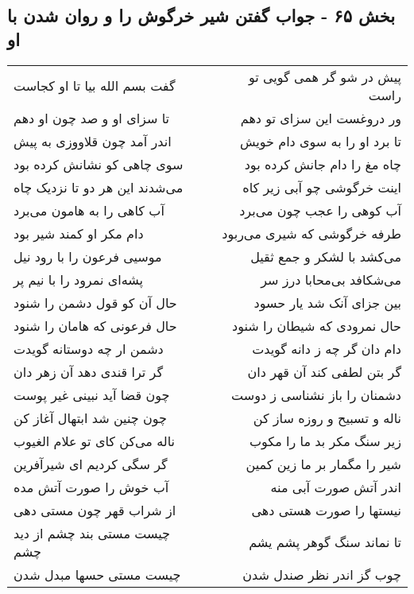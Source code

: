 \begin{center}
\section*{بخش ۶۵ - جواب گفتن شیر خرگوش را و روان شدن با او}
\label{sec:sh065}
\begin{longtable}{l p{0.5cm} r}
گفت بسم الله بیا تا او کجاست
&&
پیش در شو گر همی گویی تو راست
\\
تا سزای او و صد چون او دهم
&&
ور دروغست این سزای تو دهم
\\
اندر آمد چون قلاووزی به پیش
&&
تا برد او را به سوی دام خویش
\\
سوی چاهی کو نشانش کرده بود
&&
چاه مغ را دام جانش کرده بود
\\
می‌شدند این هر دو تا نزدیک چاه
&&
اینت خرگوشی چو آبی زیر کاه
\\
آب کاهی را به هامون می‌برد
&&
آب کوهی را عجب چون می‌برد
\\
دام مکر او کمند شیر بود
&&
طرفه خرگوشی که شیری می‌ربود
\\
موسیی فرعون را با رود نیل
&&
می‌کشد با لشکر و جمع ثقیل
\\
پشه‌ای نمرود را با نیم پر
&&
می‌شکافد بی‌محابا درز سر
\\
حال آن کو قول دشمن را شنود
&&
بین جزای آنک شد یار حسود
\\
حال فرعونی که هامان را شنود
&&
حال نمرودی که شیطان را شنود
\\
دشمن ار چه دوستانه گویدت
&&
دام دان گر چه ز دانه گویدت
\\
گر ترا قندی دهد آن زهر دان
&&
گر بتن لطفی کند آن قهر دان
\\
چون قضا آید نبینی غیر پوست
&&
دشمنان را باز نشناسی ز دوست
\\
چون چنین شد ابتهال آغاز کن
&&
ناله و تسبیح و روزه ساز کن
\\
ناله می‌کن کای تو علام الغیوب
&&
زیر سنگ مکر بد ما را مکوب
\\
گر سگی کردیم ای شیرآفرین
&&
شیر را مگمار بر ما زین کمین
\\
آب خوش را صورت آتش مده
&&
اندر آتش صورت آبی منه
\\
از شراب قهر چون مستی دهی
&&
نیستها را صورت هستی دهی
\\
چیست مستی بند چشم از دید چشم
&&
تا نماند سنگ گوهر پشم یشم
\\
چیست مستی حسها مبدل شدن
&&
چوب گز اندر نظر صندل شدن
\\
\end{longtable}
\end{center}
